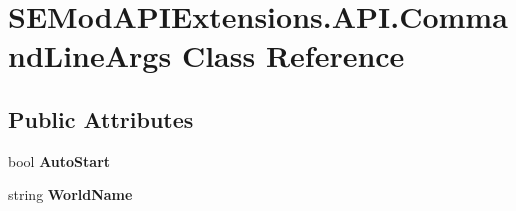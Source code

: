 \hypertarget{class_s_e_mod_a_p_i_extensions_1_1_a_p_i_1_1_command_line_args}{}\section{S\+E\+Mod\+A\+P\+I\+Extensions.\+A\+P\+I.\+Command\+Line\+Args Class Reference}
\label{class_s_e_mod_a_p_i_extensions_1_1_a_p_i_1_1_command_line_args}
\subsection*{Public Attributes}
\begin{DoxyCompactItemize}
\item 
\hypertarget{class_s_e_mod_a_p_i_extensions_1_1_a_p_i_1_1_command_line_args_a97230a7771db654749df2ed2078bed4a}{}bool {\bfseries Auto\+Start}\label{class_s_e_mod_a_p_i_extensions_1_1_a_p_i_1_1_command_line_args_a97230a7771db654749df2ed2078bed4a}

\item 
\hypertarget{class_s_e_mod_a_p_i_extensions_1_1_a_p_i_1_1_command_line_args_aaea57e48e2cd3466f260bb6fa17d87de}{}string {\bfseries World\+Name}\label{class_s_e_mod_a_p_i_extensions_1_1_a_p_i_1_1_command_line_args_aaea57e48e2cd3466f260bb6fa17d87de}


\end{DoxyCompactItemize}
